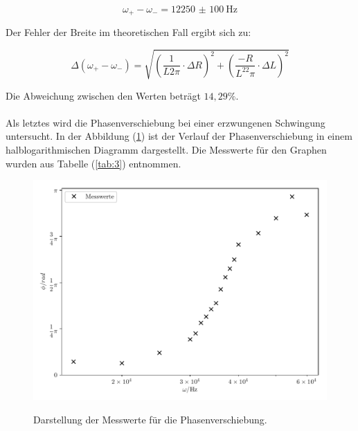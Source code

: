 \begin{equation*}
  \omega_+ - \omega_- = \SI{12250(100)}{\Hz}
\end{equation*}

Der Fehler der Breite im theoretischen Fall ergibt sich zu:

\begin{equation*}
  \Delta(\omega_+ - \omega_-) = \sqrt{\left(\frac{1}{L2\pi} \cdot \Delta R \right)^2 +
  \left(\frac{-R}{L^22\pi} \cdot \Delta L\right)^2}
\end{equation*}

Die Abweichung zwischen den Werten beträgt $14,29 \% $.\\\\

Als letztes wird die Phasenverschiebung \phi bei einer erzwungenen Schwingung untersucht.
In der Abbildung (\ref{fig:10}) ist der Verlauf der Phasenverschiebung in einem
halblogarithmischen Diagramm dargestellt. Die Messwerte für den Graphen wurden aus
Tabelle (\ref{tab:3}) entnommen.

\begin{figure}[H]
  \centering
  \caption{Darstellung der Messwerte für die Phasenverschiebung.}
  \includegraphics[width=\textwidth]{plot4.pdf}
  \label{fig:10}
\end{figure}

